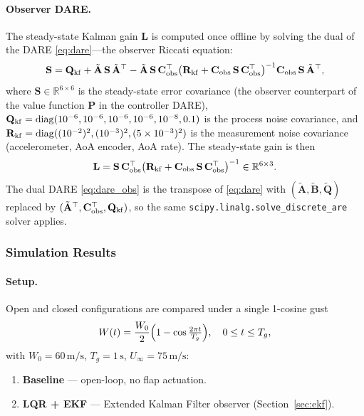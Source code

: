 \documentclass[11pt,a4paper]{article}
\newcommand{\mA}{\mathbf{A}}
\newcommand{\mB}{\mathbf{B}}
\newcommand{\mQ}{\mathbf{Q}}
\begin{document}
\paragraph{Observer DARE.}
The steady-state Kalman gain $\mathbf{L}$ is computed once offline by solving
the dual of the DARE \eqref{eq:dare}---the observer Riccati equation:
\begin{equation}
  \mathbf{S} = \mathbf{Q}_{\rm kf}
    + \tilde{\mA}\,\mathbf{S}\,\tilde{\mA}^\top
    - \tilde{\mA}\,\mathbf{S}\,\mathbf{C}_{\rm obs}^\top
      \bigl(\mathbf{R}_{\rm kf} + \mathbf{C}_{\rm obs}\,\mathbf{S}\,\mathbf{C}_{\rm obs}^\top\bigr)^{-1}
      \mathbf{C}_{\rm obs}\,\mathbf{S}\,\tilde{\mA}^\top,
  \label{eq:dare_obs}
\end{equation}
where $\mathbf{S} \in \mathbb{R}^{6\times6}$ is the steady-state error covariance
(the observer counterpart of the value function $\mathbf{P}$ in the controller DARE),
$\mathbf{Q}_{\rm kf} = \operatorname{diag}(10^{-6},10^{-6},10^{-6},10^{-6},10^{-8},0.1)$
is the process noise covariance, and
$\mathbf{R}_{\rm kf} = \operatorname{diag}((10^{-2})^2,(10^{-3})^2,(5\times10^{-3})^2)$
is the measurement noise covariance (accelerometer, AoA encoder, AoA rate).
The steady-state gain is then
\begin{equation}
  \mathbf{L} = \mathbf{S}\,\mathbf{C}_{\rm obs}^\top
    \bigl(\mathbf{R}_{\rm kf} + \mathbf{C}_{\rm obs}\,\mathbf{S}\,\mathbf{C}_{\rm obs}^\top\bigr)^{-1}
  \in \mathbb{R}^{6\times3}.
  \label{eq:kalman_gain}
\end{equation}
The dual DARE \eqref{eq:dare_obs} is the transpose of \eqref{eq:dare} with
$(\tilde{\mA}, \tilde{\mB}, \tilde{\mQ})$ replaced by
$(\tilde{\mA}^\top, \mathbf{C}_{\rm obs}^\top, \mathbf{Q}_{\rm kf})$,
so the same \texttt{scipy.linalg.solve\_discrete\_are} solver applies.

\subsubsection{Simulation Results}
\label{sec:results}

\paragraph{Setup.}
Open and closed configurations are compared under a single 1-cosine gust
\begin{equation}
  W(t) = \frac{W_0}{2}\Bigl(1 - \cos\tfrac{2\pi t}{T_g}\Bigr),
  \quad 0 \le t \le T_g,
\end{equation}
with $W_0 = 60\,\text{m/s}$, $T_g = 1\,\text{s}$, $U_\infty = 75\,\text{m/s}$:
\begin{enumerate}
  \item \textbf{Baseline} --- open-loop, no flap actuation.
  \item \textbf{LQR + EKF} --- Extended Kalman Filter observer
        (Section~\ref{sec:ekf}).
\end{enumerate}
\end{document}
